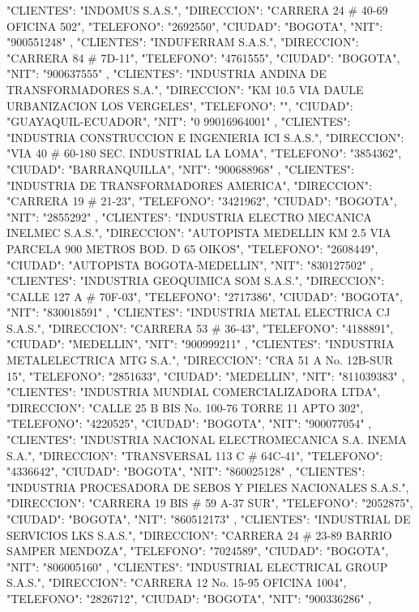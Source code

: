    {
   "CLIENTES": "INDOMUS S.A.S.",
   "DIRECCION": "CARRERA 24 # 40-69 OFICINA 502",
   "TELEFONO": "2692550",
   "CIUDAD": "BOGOTA",
   "NIT": "900551248"
   },
   {
   "CLIENTES": "INDUFERRAM S.A.S.",
   "DIRECCION": "CARRERA 84 # 7D-11",
   "TELEFONO": "4761555",
   "CIUDAD": "BOGOTA",
   "NIT": "900637555"
   },
   {
   "CLIENTES": "INDUSTRIA ANDINA DE TRANSFORMADORES S.A.",
   "DIRECCION": "KM 10.5 VIA DAULE URBANIZACION LOS VERGELES",
   "TELEFONO": "",
   "CIUDAD": "GUAYAQUIL-ECUADOR",
   "NIT": "0 99016964001"
   },
   {
   "CLIENTES": "INDUSTRIA CONSTRUCCION E INGENIERIA ICI S.A.S.",
   "DIRECCION": "VIA 40 # 60-180 SEC. INDUSTRIAL LA LOMA",
   "TELEFONO": "3854362",
   "CIUDAD": "BARRANQUILLA",
   "NIT": "900688968"
   },
   {
   "CLIENTES": "INDUSTRIA DE TRANSFORMADORES AMERICA",
   "DIRECCION": "CARRERA 19 # 21-23",
   "TELEFONO": "3421962",
   "CIUDAD": "BOGOTA",
   "NIT": "2855292"
   },
   {
   "CLIENTES": "INDUSTRIA ELECTRO MECANICA INELMEC S.A.S.",
   "DIRECCION": "AUTOPISTA MEDELLIN KM 2.5 VIA PARCELA 900 METROS BOD. D 65 OIKOS",
   "TELEFONO": "2608449",
   "CIUDAD": "AUTOPISTA BOGOTA-MEDELLIN",
   "NIT": "830127502"
   },
   {
   "CLIENTES": "INDUSTRIA GEOQUIMICA SOM S.A.S.",
   "DIRECCION": "CALLE 127 A # 70F-03",
   "TELEFONO": "2717386",
   "CIUDAD": "BOGOTA",
   "NIT": "830018591"
   },
   {
   "CLIENTES": "INDUSTRIA METAL ELECTRICA CJ S.A.S.",
   "DIRECCION": "CARRERA 53 # 36-43",
   "TELEFONO": "4188891",
   "CIUDAD": "MEDELLIN",
   "NIT": "900999211"
   },
   {
   "CLIENTES": "INDUSTRIA METALELECTRICA MTG S.A.",
   "DIRECCION": "CRA 51 A No. 12B-SUR 15",
   "TELEFONO": "2851633",
   "CIUDAD": "MEDELLIN",
   "NIT": "811039383"
   },
   {
   "CLIENTES": "INDUSTRIA MUNDIAL COMERCIALIZADORA LTDA",
   "DIRECCION": "CALLE 25 B BIS No. 100-76 TORRE 11 APTO 302",
   "TELEFONO": "4220525",
   "CIUDAD": "BOGOTA",
   "NIT": "900077054"
   },
   {
   "CLIENTES": "INDUSTRIA NACIONAL ELECTROMECANICA S.A. INEMA S.A.",
   "DIRECCION": "TRANSVERSAL 113 C # 64C-41",
   "TELEFONO": "4336642",
   "CIUDAD": "BOGOTA",
   "NIT": "860025128"
   },
   {
   "CLIENTES": "INDUSTRIA PROCESADORA DE SEBOS Y PIELES NACIONALES S.A.S.",
   "DIRECCION": "CARRERA 19 BIS # 59 A-37 SUR",
   "TELEFONO": "2052875",
   "CIUDAD": "BOGOTA",
   "NIT": "860512173"
   },
   {
   "CLIENTES": "INDUSTRIAL DE SERVICIOS LKS S.A.S.",
   "DIRECCION": "CARRERA 24 # 23-89 BARRIO SAMPER MENDOZA",
   "TELEFONO": "7024589",
   "CIUDAD": "BOGOTA",
   "NIT": "806005160"
   },
   {
   "CLIENTES": "INDUSTRIAL ELECTRICAL GROUP S.A.S.",
   "DIRECCION": "CARRERA 12 No. 15-95 OFICINA 1004",
   "TELEFONO": "2826712",
   "CIUDAD": "BOGOTA",
   "NIT": "900336286"
   },
